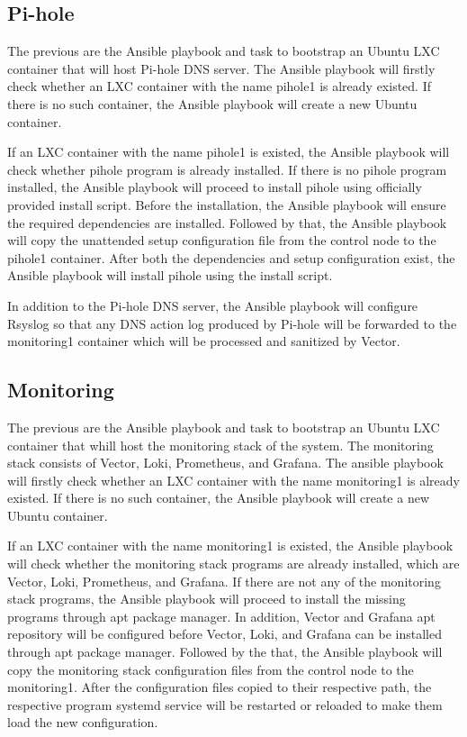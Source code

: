\documentclass[../index.tex]{subfiles}
\begin{document}
\subsection{Pi-hole}

The previous are the Ansible playbook and task to bootstrap an Ubuntu LXC container that will host
Pi-hole DNS server. The Ansible playbook will firstly check whether an LXC container with the name
pihole1 is already existed. If there is no such container, the Ansible playbook will create a new
Ubuntu container.

If an LXC container with the name pihole1 is existed, the Ansible playbook will check whether pihole
program is already installed. If there is no pihole program installed, the Ansible playbook will
proceed to install pihole using officially provided install script. Before the installation, the
Ansible playbook will ensure the required dependencies are installed. Followed by that, the Ansible
playbook will copy the unattended setup configuration file from the control node to the pihole1
container. After both the dependencies and setup configuration exist, the Ansible playbook will
install pihole using the install script.

In addition to the Pi-hole DNS server, the Ansible playbook will configure Rsyslog so that any DNS
action log produced by Pi-hole will be forwarded to the monitoring1 container which will be
processed and sanitized by Vector.

\subsection{Monitoring}

The previous are the Ansible playbook and task to bootstrap an Ubuntu LXC container that whill host
the monitoring stack of the system. The monitoring stack consists of Vector, Loki, Prometheus, and
Grafana. The ansible playbook will firstly check whether an LXC container with the name monitoring1
is already existed. If there is no such container, the Ansible playbook will create a new Ubuntu
container.

If an LXC container with the name monitoring1 is existed, the Ansible playbook will check whether
the monitoring stack programs are already installed, which are Vector, Loki, Prometheus, and
Grafana. If there are not any of the monitoring stack programs, the Ansible playbook will proceed to
install the missing programs through apt package manager. In addition, Vector and Grafana apt
repository will be configured before Vector, Loki, and Grafana can be installed through apt package
manager. Followed by the that, the Ansible playbook will copy the monitoring stack configuration
files from the control node to the monitoring1. After the configuration files copied to their
respective path, the respective program systemd service will be restarted or reloaded to make them
load the new configuration.
\end{document}
